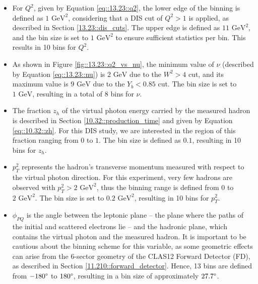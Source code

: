     \begin{itemize}
        \item
            For $Q^2$, given by Equation \eqref{eq::13.23::q2}, the lower edge of the binning is defined as $1 \text{ GeV}^2$, considering that a DIS cut of $Q^2 > 1$ is applied, as described in Section \ref{13.23::dis_cuts}.
            The upper edge is defined as $11 \text{ GeV}^2$, and the bin size is set to $1 \text{ GeV}^2$ to ensure sufficient statistics per bin.
            This results in 10 bins for $Q^2$.

        \item
            As shown in Figure \ref{fig::13.23::q2_vs_nu}, the minimum value of $\nu$ (described by Equation \eqref{eq::13.23::nu}) is $2 \text{ GeV}$ due to the $W^2 > 4$ cut, and its maximum value is $9 \text{ GeV}$ due to the $Y_b < 0.85$ cut.
            The bin size is set to $1 \text{ GeV}$, resulting in a total of 8 bins for $\nu$.

        \item
            The fraction $z_h$ of the virtual photon energy carried by the measured hadron is described in Section \ref{10.32::production_time} and given by Equation \eqref{eq::10.32::zh}.
            For this DIS study, we are interested in the region of this fraction ranging from $0$ to $1$.
            The bin size is defined as $0.1$, resulting in 10 bins for $z_h$.

        \item
            $p_T^2$ represents the hadron's transverse momentum measured with respect to the virtual photon direction.
            For this experiment, very few hadrons are observed with $p_T^2 > 2 \text{ GeV}^2$, thus the binning range is defined from $0$ to $2 \text{ GeV}^2$.
            The bin size is set to $0.2 \text{ GeV}^2$, resulting in 10 bins for $p_T^2$.

        \item
            $\phi_{PQ}$ is the angle between the leptonic plane -- the plane where the paths of the initial and scattered electrons lie -- and the hadronic plane, which contains the virtual photon and the measured hadron.
            It is important to be cautious about the binning scheme for this variable, as some geometric effects can arise from the 6-sector geometry of the CLAS12 Forward Detector (FD), as described in Section \ref{11.210::forward_detector}.
            Hence, 13 bins are defined from $-180 \degree$ to $180 \degree$, resulting in a bin size of approximately $27.7 \degree$.
    \end{itemize}

